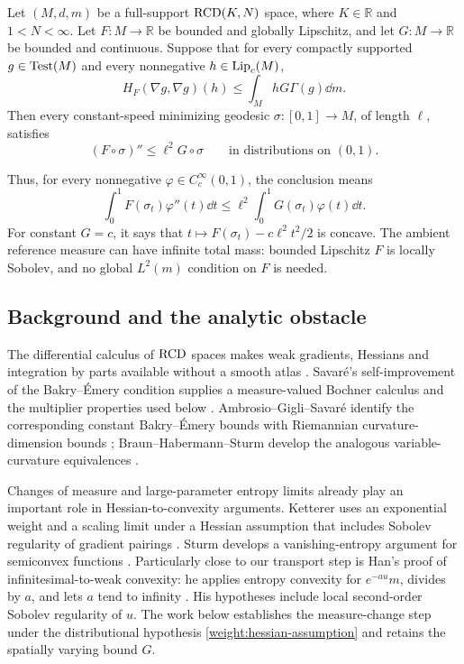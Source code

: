 \begin{theorem}
\label{weight:every-geodesic}
Let \((M,d,m)\) be a full-support \(\mathrm{RCD}(K,N)\) space,
where \(K\in\mathbb R\) and \(1<N<\infty\). Let
\(F\colon M\to\mathbb R\) be bounded and globally Lipschitz,
and let \(G\colon M\to\mathbb R\) be bounded and continuous.
Suppose that for every compactly supported \(g\in\operatorname{Test}(M)\)
and every nonnegative \(h\in\operatorname{Lip}_c(M)\),
\begin{equation}
\label{weight:hessian-assumption}
H_F(\nabla g,\nabla g)(h)
\le\int_M hG\Gamma(g)\dd m.
\end{equation}
Then every constant-speed minimizing geodesic
\(\sigma\colon[0,1]\to M\), of length \(\ell\), satisfies
\begin{equation}
\label{weight:curve-hessian}
(F\circ\sigma)''\le\ell^2G\circ\sigma
\qquad\text{in distributions on }(0,1).
\end{equation}
\end{theorem}

Thus, for every nonnegative \(\varphi\in C_c^\infty(0,1)\), the
conclusion means
\[
\int_0^1 F(\sigma_t)\varphi''(t)\dd t
\le \ell^2\int_0^1 G(\sigma_t)\varphi(t)\dd t.
\]
For constant \(G=c\), it says that
\(t\mapsto F(\sigma_t)-c\ell^2t^2/2\) is concave.
The ambient reference measure can have infinite total mass:
bounded Lipschitz \(F\) is locally Sobolev, and no global
\(L^2(m)\) condition on \(F\) is needed.

\subsection{Background and the analytic obstacle}

The differential calculus of \(\mathrm{RCD}\) spaces makes weak gradients,
Hessians and integration by parts available without a smooth atlas
\cite{Gigli2018}. Savar\'e's self-improvement of the
Bakry--\'Emery condition supplies a measure-valued Bochner calculus
and the multiplier properties used below \cite{Savare2014}.
Ambrosio--Gigli--Savar\'e identify the corresponding constant
Bakry--\'Emery bounds with Riemannian curvature-dimension bounds
\cite{AGS2015}; Braun--Habermann--Sturm develop the analogous
variable-curvature equivalences \cite{BHS2021}.

Changes of measure and large-parameter entropy limits already play
an important role in Hessian-to-convexity arguments. Ketterer uses
an exponential weight and a scaling limit under a Hessian assumption
that includes Sobolev regularity of gradient pairings
\cite[Theorem~7.1 and its proof]{Ketterer2015Obata}. Sturm develops a
vanishing-entropy argument for semiconvex functions
\cite[Lemmas~1 and 2]{Sturm2018}. Particularly close to our transport
step is Han's proof of infinitesimal-to-weak convexity: he applies
entropy convexity for \(e^{-a u}m\), divides by \(a\), and lets
\(a\) tend to infinity \cite[Theorem~3.13, Equation~(3.6)]{Han2018Monotonicity}.
His hypotheses include local second-order Sobolev regularity of
\(u\). The work below establishes the measure-change step under
the distributional hypothesis \eqref{weight:hessian-assumption}
and retains the spatially varying bound \(G\).

